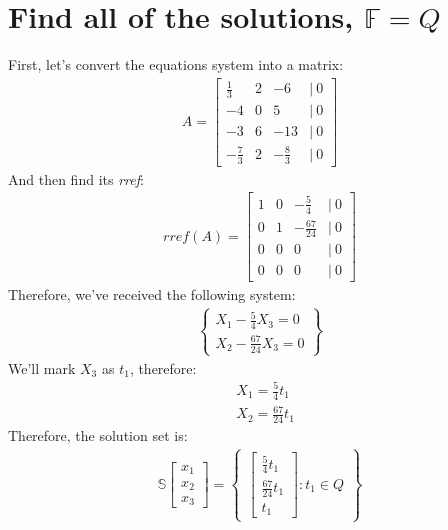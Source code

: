 \documentclass[a4paper, 12pt]{article}
\newcommand{\?}{\stackrel{?}{=}}
\newcommand{\F}{\ensuremath{\mathbb{F}}}
\newcommand{\eq}[1]{\begin{align*}#1\end{align*}}
\begin{document}
\setcounter{section}{7}
\section{Find all of the solutions, $\F=Q$}
First, let's convert the equations system into a matrix:
\eq{A=\begin{bmatrix}
    \frac{1}{3}&2&-6&|~0\\
    -4&0&5&|~0\\
    -3&6&-13&|~0\\
    -\frac{7}{3}&2&-\frac{8}{3}&|~0
\end{bmatrix}}
And then find its \textit{rref}:
\eq{rref(A)=\begin{bmatrix}
    1&0&-\frac{5}{4}&|~0\\
    0&1&-\frac{67}{24}&|~0\\
    0&0&0&|~0\\
    0&0&0&|~0
\end{bmatrix}}
Therefore, we've received the following system:
\eq{\begin{Bmatrix}
    X_1-\frac{5}{4}X_3=0\\
    X_2-\frac{67}{24}X_3=0
\end{Bmatrix}}
We'll mark $X_3$ as $t_1$, therefore:
\eq{&X_1=\frac{5}{4}t_1\\&X_2=\frac{67}{24}t_1}
Therefore, the solution set is:
\eq{
    \mathbb{S}
    \begin{bmatrix}x_1\\x_2\\x_3\end{bmatrix}
    =
    \begin{Bmatrix}
        \begin{bmatrix}\frac{5}{4}t_1\\\frac{67}{24}t_1\\t_1\end{bmatrix}
    :
    t_1\in{Q}
    \end{Bmatrix}
}
\pagebreak

\setcounter{section}{9}
\end{document}
